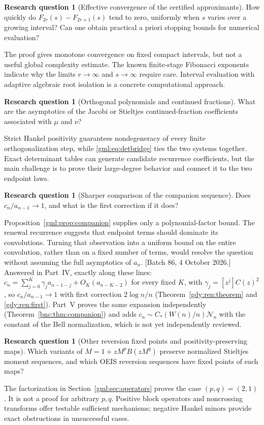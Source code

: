 \documentclass[11pt]{article}
\numberwithin{equation}{section}
\theoremstyle{definition}
\newtheorem{question}[theorem]{Research question}
\theoremstyle{remark}
\begin{document}
\begin{question}[Effective convergence of the certified approximants]
How quickly do $F_{2r}(s)-F_{2r+1}(s)$ tend to zero, uniformly when $s$
varies over a growing interval? Can one obtain practical a priori
stopping bounds for numerical evaluation?
\end{question}
The proof gives monotone convergence on fixed compact intervals, but
not a useful global complexity estimate. The known finite-stage Fibonacci
exponents indicate why the limits $r\to\infty$ and $s\to\infty$ require
care. Interval evaluation with adaptive algebraic root isolation is a
concrete computational approach.

\begin{question}[Orthogonal polynomials and continued fractions]
What are the asymptotics of the Jacobi or Stieltjes continued-fraction
coefficients associated with $\mu$ and $\nu$?
\end{question}
Strict Hankel positivity guarantees nondegeneracy of every finite
orthogonalization step, while \eqref{gml:eq:detbridge} ties the two systems
together. Exact determinant tables can generate candidate recurrence
coefficients, but the main challenge is to prove their large-degree
behavior and connect it to the two endpoint laws.

\begin{question}[Sharper comparison of the companion sequence]
Does $c_n/a_{n-1}\to1$, and what is the first correction if it does?
\end{question}
Proposition~\ref{gml:prop:companion} supplies only a polynomial-factor bound.
The renewal recurrence suggests that endpoint terms should dominate its
convolutions. Turning that observation into a uniform bound on the entire
convolution, rather than on a fixed number of terms, would resolve the
question without assuming the full asymptotics of $a_n$.
[Batch 86, 4 October 2026.] Answered in Part~IV, exactly along these lines:
$c_n=\sum_{j=0}^{K}\gamma_ja_{n-1-j}+O_K(a_{n-K-2})$ for every fixed $K$,
with $\gamma_j=[z^j]C(z)^2$, so $c_n/a_{n-1}\to1$ with first correction
$2\log n/n$ (Theorem~\ref{gdy:ren:theorem} and \eqref{gdy:ren:first}).
Part~V proves the same expansion independently
(Theorem~\ref{bnc:thm:companion}) and adds
$c_n\sim C_*(W(n)/n)\mathcal N_n$ with the constant of the Bell
normalization, which is not yet independently reviewed.

\begin{question}[Other reversion fixed points and positivity-preserving maps]
Which variants of
$M=1+zM^pB(zM^q)$ preserve normalized Stieltjes moment sequences, and
which OEIS reversion sequences have fixed points of such maps?
\end{question}
The factorization in Section~\ref{gml:sec:operators} proves the case
$(p,q)=(2,1)$. It is not a proof for arbitrary $p,q$. Positive block
operators and noncrossing transforms offer testable sufficient mechanisms;
negative Hankel minors provide exact obstructions in unsuccessful cases.
\end{document}
